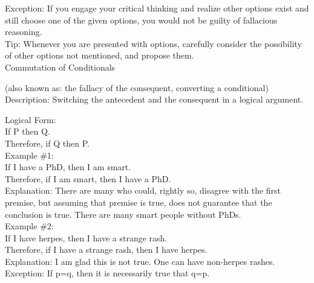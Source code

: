 \documentclass[a4paper,12pt,single,pdftex]{scrartcl}
\begin{document}
    
      Exception: If you engage your critical thinking and realize other options exist and still choose one of the given options, you would not be guilty of fallacious reasoning.
    \\

    
      Tip: Whenever you are presented with options, carefully consider the possibility of other options not mentioned, and propose them.
    \\

  

Commutation of Conditionals
    
      (also known as: the fallacy of the consequent, converting a conditional)
    \\

  
    Description: Switching the antecedent and the consequent in a logical argument.

    
      Logical Form:
    \\

    
      If P then Q.
    \\

    
      Therefore, if Q then P.
    \\

    
      Example \#1:
    \\

    
      If I have a PhD, then I am smart.
    \\

    
      Therefore, if I am smart, then I have a PhD.
    \\

    
      Explanation: There are many who could, rightly so, disagree with the first premise, but assuming that premise is true, does not guarantee that the conclusion is true.  There are many smart people without PhDs.
    \\

    
      Example \#2:
    \\

    
      If I have herpes, then I have a strange rash.
    \\

    
      Therefore, if I have a strange rash, then I have herpes.
    \\

    
      Explanation: I am glad this is not true.  One can have non-herpes rashes.
    \\

    
      Exception: If p=q, then it is necessarily true that q=p.
    \\
\end{document}
